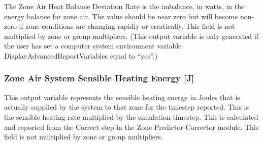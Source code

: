 The Zone Air Heat Balance Deviation Rate is the imbalance, in watts, in the energy balance for zone air. The value should be near zero but will become non-zero if zone conditions are changing rapidly or erratically. This field is not multiplied by zone or group multipliers. (This output variable is only generated if the user has set a computer system environment variable DisplayAdvancedReportVariables equal to ``yes''.)

\subsubsection{Zone Air System Sensible Heating Energy {[}J{]}}\label{zone-air-system-sensible-heating-energy-j}

This output variable represents the sensible heating energy in Joules that is actually supplied by the system to that zone for the timestep reported. This is the sensible heating rate multiplied by the simulation timestep. This is calculated and reported from the Correct step in the Zone Predictor-Corrector module. This field is not multiplied by zone or group multipliers.

